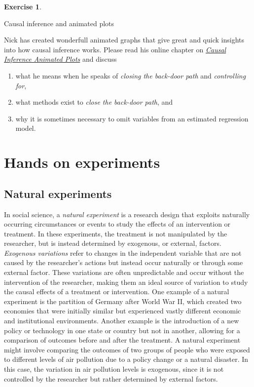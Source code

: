 \documentclass[
  12pt,
  oneside]{book}
\providecommand{\tightlist}{%
  \setlength{\itemsep}{0pt}\setlength{\parskip}{0pt}}
\theoremstyle{definition}
\theoremstyle{definition}
\theoremstyle{definition}
\newtheorem{exercise}{Exercise}[chapter]
\theoremstyle{definition}
\theoremstyle{remark}
\begin{document}
\begin{exercise}
\protect\hypertarget{exr:causalgraphnhk}{}\label{exr:causalgraphnhk}

Causal inference and animated plots

Nick \citet{Huntington-Klein2022Effect} has created wonderfull animated graphs that give great and quick insights into how causal inference works. Please read his online chapter on \href{https://www.nickchk.com/causalgraphs.html}{\emph{Causal Inference Animated Plots}} and discuss

\begin{enumerate}
\def\labelenumi{\alph{enumi})}
\tightlist
\item
  what he means when he speaks of \emph{closing the back-door path} and \emph{controlling for},
\item
  what methods exist to \emph{close the back-door path}, and
\item
  why it is sometimes necessary to omit variables from an estimated regression model.
\end{enumerate}

\end{exercise}

\hypertarget{hands-on-experiments}{%
\chapter{Hands on experiments}\label{hands-on-experiments}}

\hypertarget{natural-experiments}{%
\section{Natural experiments}\label{natural-experiments}}

In social science, a \emph{natural experiment} is a research design that exploits naturally occurring circumstances or events to study the effects of an intervention or treatment. In these experiments, the treatment is not manipulated by the researcher, but is instead determined by exogenous, or external, factors. \emph{Exogenous variations} refer to changes in the independent variable that are not caused by the researcher's actions but instead occur naturally or through some external factor. These variations are often unpredictable and occur without the intervention of the researcher, making them an ideal source of variation to study the causal effects of a treatment or intervention.
One example of a natural experiment is the partition of Germany after World War II, which created two economies that were initially similar but experienced vastly different economic and institutional environments. Another example is the introduction of a new policy or technology in one state or country but not in another, allowing for a comparison of outcomes before and after the treatment.
A natural experiment might involve comparing the outcomes of two groups of people who were exposed to different levels of air pollution due to a policy change or a natural disaster. In this case, the variation in air pollution levels is exogenous, since it is not controlled by the researcher but rather determined by external factors.
\end{document}
